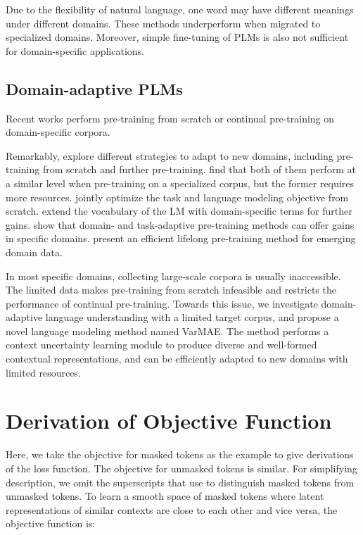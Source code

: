 \documentclass[11pt]{article}
\begin{document}
Due to the flexibility of natural language, one word may have different meanings under different domains. These methods underperform when migrated to specialized domains. Moreover, simple fine-tuning \cite{DBLP:conf/acl/RuderH18,DBLP:conf/seke/HuW20,DBLP:conf/pkdd/WeiHZTZWHH20,hu2022pali} of PLMs is also not sufficient for domain-specific applications.

\subsection{Domain-adaptive PLMs}
Recent works perform pre-training from scratch \cite{ DBLP:journals/health/GuTCLULNGP22,yao2022nlp} or continual pre-training \cite{alsentzer2019publicly,DBLP:journals/corr/abs-1904-05342,DBLP:journals/bioinformatics/LeeYKKKSK20,DBLP:conf/acl/GururanganMSLBD20,DBLP:conf/iclr/WuCLLQH22,DBLP:conf/acl/QinZLL0SZ22} on domain-specific corpora.

Remarkably, \citet{DBLP:conf/emnlp/BeltagyLC19,DBLP:conf/emnlp/ChalkidisFMAA20} 
explore different strategies to adapt to new domains, including pre-training from scratch and further pre-training.
\citet{DBLP:conf/lrec/BoukkouriFLZ22} find that both of them perform at a similar level when pre-training on a specialized corpus, but the former 
requires more resources. 
\citet{yao2022nlp} jointly optimize the task and language modeling objective from scratch.
\citet{DBLP:conf/emnlp/ZhangRSCFFKRSW20,DBLP:conf/emnlp/Tai0DCK20,DBLP:conf/acl/YaoHWDW21} extend the vocabulary of the LM with domain-specific terms for further gains.
\citet{DBLP:conf/acl/GururanganMSLBD20} show that domain- and task-adaptive pre-training methods can offer gains in specific domains.
\citet{DBLP:conf/acl/QinZLL0SZ22} present an efficient lifelong pre-training method for emerging domain data.



In most specific domains, collecting large-scale corpora is usually inaccessible. 
The limited data makes pre-training from scratch infeasible and restricts the performance of continual pre-training.
Towards this issue, we investigate domain-adaptive language understanding with a limited target corpus, and propose a novel language modeling method named VarMAE.
The method performs a context uncertainty learning module to produce diverse and well-formed contextual representations,
and can be efficiently
adapted to new domains with limited resources.



\section{Derivation of Objective Function} \label{app:loss}
Here, we take the objective for masked tokens as the example to give derivations of the loss function.
The objective for unmasked tokens is similar. For simplifying description, we omit  the superscripts that use to distinguish masked tokens from unmasked tokens.
To learn a smooth space of masked tokens where latent representations of similar contexts are close to each other and vice versa, the objective function is:
\end{document}
